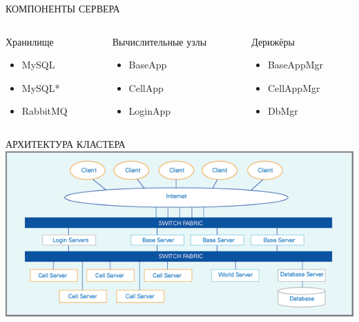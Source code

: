 \documentclass[aspectratio=169]{beamer}
\begin{document}
\begin{frame}{КОМПОНЕНТЫ СЕРВЕРА}
    \begin{columns}

    \begin{column}{0.33\textwidth}
    \begin{block}{Хранилище}
        \begin{itemize}
            \item MySQL
            \item MySQL*
            \item RabbitMQ
        \end{itemize}
    \end{block}
    \end{column}

    \begin{column}{0.33\textwidth}
    \begin{block}{Вычислительные узлы}
        \begin{itemize}
            \item BaseApp
            \item CellApp
            \item LoginApp
        \end{itemize}
    \end{block}
    \end{column}

    \begin{column}{0.33\textwidth}
    \begin{block}{Дерижёры}
        \begin{itemize}
            \item BaseAppMgr
            \item CellAppMgr
            \item DbMgr
        \end{itemize}
    \end{block}
    \end{column}

    \end{columns}
    \vspace*{1cm}
\end{frame}

{
\logo{}
\begin{frame}{АРХИТЕКТУРА КЛАСТЕРА}
\includegraphics[width=0.90\paperwidth]{server.png}
\end{frame}
}
\end{document}
